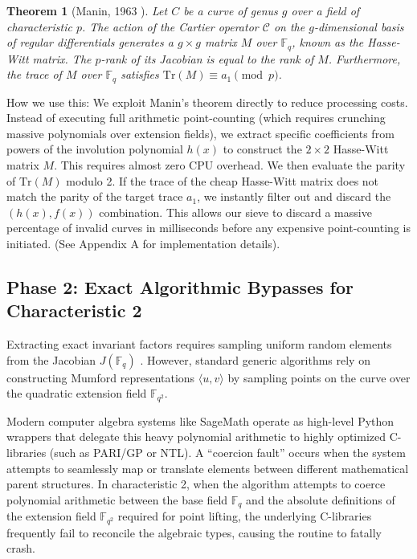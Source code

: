 \documentclass[letterpaper, 11pt]{article}
\newtheorem{theorem}{Theorem}[section]
\begin{document}
\begin{theorem}[Manin, 1963 \cite{Manin1963}]
Let $C$ be a curve of genus $g$ over a field of characteristic $p$. The action of the Cartier operator $\mathcal{C}$ on the $g$-dimensional basis of regular differentials generates a $g \times g$ matrix $M$ over $\mathbb{F}_q$, known as the Hasse-Witt matrix. The $p$-rank of its Jacobian is equal to the rank of $M$. Furthermore, the trace of $M$ over $\mathbb{F}_q$ satisfies $\text{Tr}(M) \equiv a_1 \pmod p$.
\end{theorem}

How we use this: We exploit Manin's theorem directly to reduce processing costs. Instead of executing full arithmetic point-counting (which requires crunching massive polynomials over extension fields), we extract specific coefficients from powers of the involution polynomial $h(x)$ to construct the $2 \times 2$ Hasse-Witt matrix $M$. This requires almost zero CPU overhead. We then evaluate the parity of $\text{Tr}(M)$ modulo 2. If the trace of the cheap Hasse-Witt matrix does not match the parity of the target trace $a_1$, we instantly filter out and discard the $(h(x), f(x))$ combination. This allows our sieve to discard a massive percentage of invalid curves in milliseconds before any expensive point-counting is initiated. (See Appendix A for implementation details).

\subsection{Phase 2: Exact Algorithmic Bypasses for Characteristic 2}
Extracting exact invariant factors requires sampling uniform random elements from the Jacobian $J(\mathbb{F}_q)$ \cite{Sutherland2007}. However, standard generic algorithms rely on constructing Mumford representations $\langle u, v \rangle$ \cite{Cantor1987} by sampling points on the curve over the quadratic extension field $\mathbb{F}_{q^2}$. 

Modern computer algebra systems like SageMath \cite{SageMath2026} operate as high-level Python wrappers that delegate this heavy polynomial arithmetic to highly optimized C-libraries (such as PARI/GP or NTL). A ``coercion fault'' occurs when the system attempts to seamlessly map or translate elements between different mathematical parent structures. In characteristic 2, when the algorithm attempts to coerce polynomial arithmetic between the base field $\mathbb{F}_{q}$ and the absolute definitions of the extension field $\mathbb{F}_{q^2}$ required for point lifting, the underlying C-libraries frequently fail to reconcile the algebraic types, causing the routine to fatally crash.
\end{document}
